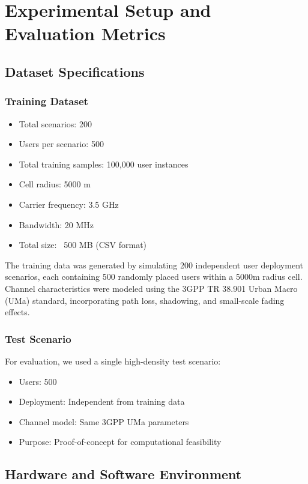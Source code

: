 \chapter{Experimental Setup and Evaluation Metrics}
\label{chap:experiments}

\section{Dataset Specifications}

\subsection{Training Dataset}
\begin{itemize}
    \item Total scenarios: 200
    \item Users per scenario: 500
    \item Total training samples: 100,000 user instances
    \item Cell radius: 5000 m
    \item Carrier frequency: 3.5 GHz
    \item Bandwidth: 20 MHz
    \item Total size: ~500 MB (CSV format)
\end{itemize}

The training data was generated by simulating 200 independent user deployment scenarios, each containing 500 randomly placed users within a 5000m radius cell. Channel characteristics were modeled using the 3GPP TR 38.901 Urban Macro (UMa) standard, incorporating path loss, shadowing, and small-scale fading effects.

\subsection{Test Scenario}

For evaluation, we used a single high-density test scenario:
\begin{itemize}
    \item Users: 500
    \item Deployment: Independent from training data
    \item Channel model: Same 3GPP UMa parameters
    \item Purpose: Proof-of-concept for computational feasibility
\end{itemize}

\section{Hardware and Software Environment}

